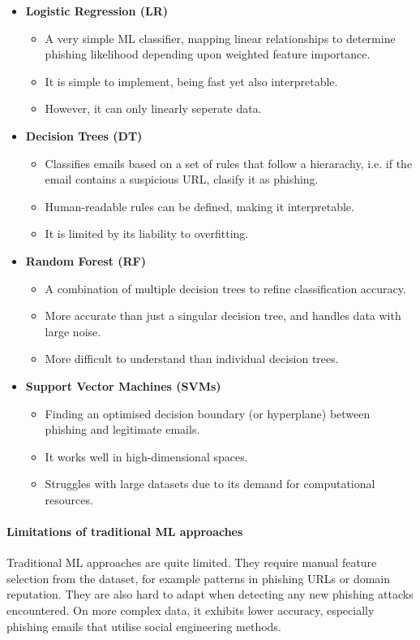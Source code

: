 \begin{itemize}
    \item \textbf{Logistic Regression (LR)}
    \begin{itemize}
        \item A very simple ML classifier, mapping linear relationships to determine phishing likelihood depending upon weighted feature importance.
        \item It is simple to implement, being fast yet also interpretable.
        \item However, it can only linearly seperate data.
    \end{itemize}
    \item \textbf{Decision Trees (DT)}
    \begin{itemize}
        \item Classifies emails based on a set of rules that follow a hierarachy, i.e. if the email contains a suspicious URL, clasify it as phishing.
        \item Human-readable rules can be defined, making it interpretable.
        \item It is limited by its liability to overfitting.
    \end{itemize}
    \item \textbf{Random Forest (RF)}
    \begin{itemize}
        \item A combination of multiple decision trees to refine classification accuracy.
        \item More accurate than just a singular decision tree, and handles data with large noise.
        \item More difficult to understand than individual decision trees.
    \end{itemize}
    \item \textbf{Support Vector Machines (SVMs)}
    \begin{itemize}
        \item Finding an optimised decision boundary (or hyperplane) between phishing and legitimate emails.
        \item It works well in high-dimensional spaces.
        \item Struggles with large datasets due to its demand for computational resources.
    \end{itemize}
\end{itemize}

\paragraph{Limitations of traditional ML approaches}
Traditional ML approaches are quite limited. They require manual feature selection from the dataset, for example patterns in phishing URLs or domain reputation. They are also hard to adapt when detecting any new phishing attacks encountered. On more complex data, it exhibits lower accuracy, especially phishing emails that utilise social engineering methods.

